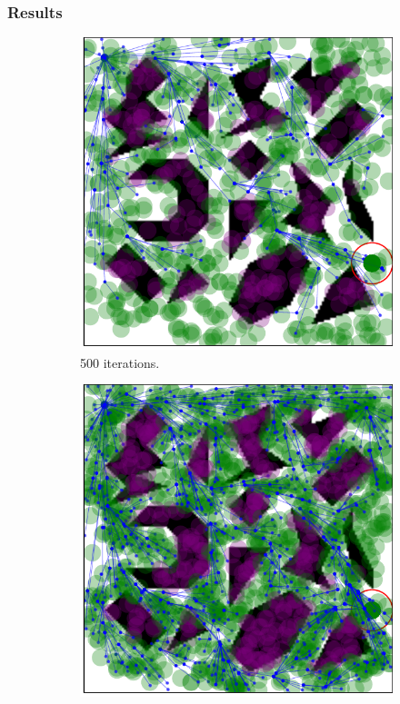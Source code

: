\documentclass{beamer}
\begin{document}

\begin{frame}
	\frametitle{Results}	
	\begin{figure}
		\centering
		\begin{subfigure}[b]{0.32\textwidth}
		  \includegraphics[width=\textwidth]{figChap5/Maze_clutter_RRTstarML_learning500.pdf}  
		  \caption{500 iterations.}
		\end{subfigure}  
		\begin{subfigure}[b]{0.32\textwidth}
		  \includegraphics[width=\textwidth]{figChap5/Maze_clutter_RRTstarML_learning1000.pdf}  

\end{subfigure}
\end{figure}
\end{frame}
\end{document}
